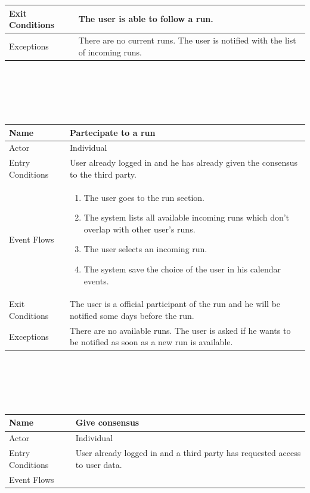 \documentclass{article}
\begin{document}
\begin{legal}
\begin{legal}
\begin{legal}
\begin{tabular}{| m{3.5cm} | m{8cm}| }
				\hline
					Exit Conditions & The user is able to follow a run.\\
				\hline
					Exceptions & There are no current runs. The user is notified with the list of incoming runs.\\
				\hline
				\end{tabular}\\
				\\\\\\
				\begin{tabular}{| m{3.5cm} | m{8cm}| }
				\hline
					Name & Partecipate to a run\\
				\hline
					Actor & Individual\\
				\hline
					Entry Conditions & User already logged in and he has already given the consensus to the third party.\\
				\hline
					Event Flows & \begin{enumerate}
									\item The user goes to the run section.
									\item The system lists all available incoming runs which don't overlap with other user's runs.
									\item The user selects an incoming run.
									\item The system save the choice of the user in his calendar events.
				\end{enumerate}\\
				\hline
					Exit Conditions & The user is a official participant of the run and he will be notified some days before the run.\\
				\hline
					Exceptions & There are no available runs. The user is asked if he wants to be notified as soon as a new run is available.\\
				\hline
				\end{tabular}\\
				\\\\\\
				\begin{tabular}{| m{3.5cm} | m{8cm}| }
				\hline
					Name & Give consensus\\
				\hline
					Actor & Individual\\
				\hline
					Entry Conditions & User already logged in and a third party has requested access to user data.\\
				\hline
					Event Flows & \begin{enumerate}

\end{enumerate}
\end{tabular}
\end{legal}
\end{legal}
\end{legal}
\end{document}
